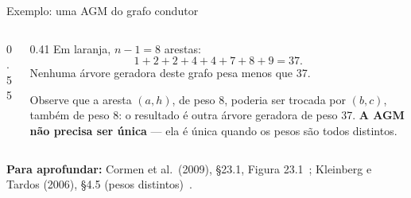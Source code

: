 \documentclass[aspectratio=169,xcolor=table]{beamer}
\newcommand{\arestasclrs}{a/b/4, a/h/8, b/c/8, b/h/11, c/d/7, c/f/4, c/i/2,
  d/e/9, d/f/14, e/f/10, f/g/2, g/h/1, g/i/6, h/i/7}
\newcommand{\grafoclrs}[3]{%
  \coordinate (a) at (0,0);     \coordinate (b) at (1,1);
  \coordinate (c) at (2.3,1);   \coordinate (d) at (3.6,1);
  \coordinate (e) at (4.6,0);   \coordinate (f) at (3.6,-1);
  \coordinate (g) at (2.3,-1);  \coordinate (h) at (1,-1);
  \coordinate (i) at (1.75,0);
  \foreach \u/\v/\w in \arestasclrs \draw[aresta] (\u) -- (\v);
  \def\lista{#1}\ifx\lista\empty\else
    \foreach \u/\v in {#1} \draw[arvore] (\u) -- (\v);\fi
  \def\lista{#3}\ifx\lista\empty\else
    \foreach \u/\v in {#3} \draw[rejeitada] (\u) -- (\v);\fi
  \foreach \u/\v/\w in \arestasclrs \path (\u) -- (\v) node[peso, pos=0.5] {\w};
  \foreach \v in {a,...,i} \node[vert] at (\v) {\v};
  \def\lista{#2}\ifx\lista\empty\else
    \foreach \v in {#2} \node[vdentro] at (\v) {\v};\fi
}
\newcommand{\fonte}[1]{%
  \vfill
  {\tiny\color{gray!55!black}\textbf{Para aprofundar:} #1\par}%
}
\begin{document}
\begin{frame}{Exemplo: uma AGM do grafo condutor}
  \begin{columns}[c]
    \begin{column}{0.55\textwidth}
      \begin{center}
      \end{center}
    \end{column}
    \begin{column}{0.41\textwidth}
      \scriptsize
      Em laranja, $n - 1 = 8$ arestas:
      \[ 1 + 2 + 2 + 4 + 4 + 7 + 8 + 9 = 37 . \]
      Nenhuma árvore geradora deste grafo pesa menos que 37.
      \medskip

      Observe que a aresta $(a,h)$, de peso 8, poderia ser trocada por $(b,c)$, também de
      peso 8: o resultado é outra árvore geradora de peso 37. \textbf{A AGM não precisa ser
      única} --- ela é única quando os pesos são todos distintos.
    \end{column}
  \end{columns}
  \fonte{Cormen et al.\ (2009), \S 23.1, Figura 23.1~\cite{cormen2009introduction};
    Kleinberg e Tardos (2006), \S 4.5 (pesos distintos)~\cite{kleinberg2006algorithm}.}
\end{frame}
\end{document}
